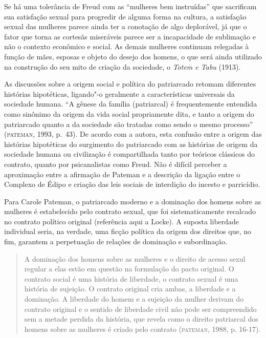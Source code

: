Se há uma tolerância de Freud com as ``mulheres bem instruídas'' que
sacrificam sua satisfação sexual para progredir de alguma forma na
cultura, a satisfação sexual das mulheres parece ainda ter a conotação
de algo deplorável, já que o fator que torna as cortesãs miseráveis
parece ser a incapacidade de sublimação e não o contexto econômico e
social. As demais mulheres continuam relegadas à função de mães, esposas
e objeto do desejo dos homens, o que será ainda utilizado na construção
do seu mito de criação da sociedade, o \emph{Totem e Tabu} (1913).

As discussões sobre a origem social e política do patriarcado retomam
diferentes histórias hipotéticas, ligando"-o geralmente a características
universais da sociedade humana. ``A gênese da família (patriarcal) é
frequentemente entendida como sinônimo da origem da vida social
propriamente dita, e tanto a origem do patriarcado quanto a da sociedade
são tratadas como sendo o mesmo processo'' (\textsc{pateman}, 1993,
p.~43). De acordo com a autora, esta confusão entre a origem das
histórias hipotéticas do surgimento do patriarcado com as histórias de
origem da sociedade humana ou civilização é compartilhada tanto por
teóricos clássicos do contrato, quanto por psicanalistas como Freud. Não
é difícil perceber a aproximação entre a afirmação de Pateman e a
descrição da ligação entre o Complexo de Édipo e criação das leis
sociais de interdição do incesto e parricídio.

Para Carole Pateman, o patriarcado moderno e a dominação dos
homens sobre as mulheres é estabelecido pelo contrato sexual, que foi
sistematicamente recalcado no contrato político original (referência
aqui a Locke). A suposta liberdade individual seria, na verdade, uma
ficção política da origem dos direitos que, no fim, garantem a
perpetuação de relações de dominação e subordinação.

\begin{quote}
A dominação dos homens sobre as mulheres e o direito de acesso sexul
regular a elas estão em questão na formulação do pacto original. O
contrato social é uma história de liberdade, o contrato sexual é uma
história de sujeição. O contrato original cria ambas, a liberdade e a
dominação. A liberdade do homem e a sujeição da mulher derivam do
contrato original e o sentido de liberdade civil não pode ser
compreendido sem a metade perdida da história, que revela como o direito
patriarcal dos homens sobre as mulheres é criado pelo contrato (\textsc{pateman}, 1988, p. 16-17).
\end{quote}

